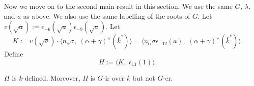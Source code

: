 \vspace{5mm}
Now we move on to the second main result in this section. We use the same $G$, $\lambda$, and $a$ as above. We also use the same labelling of the roots of $G$. Let $v(\sqrt a):=\epsilon_{-6}(\sqrt a)\epsilon_{-9}(\sqrt a)$. Let
\begin{equation*}
K:=v(\sqrt a)\cdot \langle n_{\alpha}\sigma,\; (\alpha+\gamma)^{\vee}(\overline k^*)\rangle=\langle n_\alpha \sigma \epsilon_{-12}(a), \;  (\alpha+\gamma)^{\vee}(\overline k^*)\rangle. 
\end{equation*}
Define
\begin{equation*}
H:=\langle K, \; \epsilon_{11}(1) \rangle.
\end{equation*}

\begin{prop}\label{secondmain}
$H$ is $k$-defined. Moreover, $H$ is $G$-ir over $k$ but not $G$-cr. 
\end{prop}
